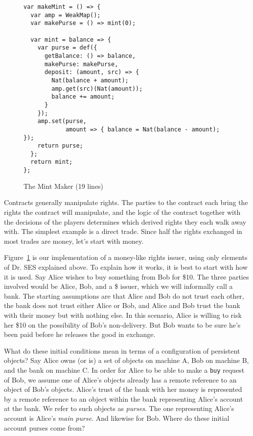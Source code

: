 \documentclass{llncs}
\begin{document}
\begin{figure}[htbp]
\begin{center}
\begin{verbatim}
var makeMint = () => {
  var amp = WeakMap();
  var makePurse = () => mint(0);
  
  var mint = balance => {
    var purse = def({
      getBalance: () => balance,
      makePurse: makePurse,
      deposit: (amount, src) => {
        Nat(balance + amount);
        amp.get(src)(Nat(amount)); 
        balance += amount; 
      } 
    });
    amp.set(purse, 
            amount => { balance = Nat(balance - amount); });
    return purse;
  };
  return mint;
};
\end{verbatim}
\caption{The Mint Maker (19 lines)}
\label{makeMint}
\end{center}
\end{figure}


Contracts generally manipulate rights. The parties to the contract each bring the rights the contract will manipulate, and the logic of the contract together with the decisions of the players determines which derived rights they each walk away with. The simplest example is a direct trade. Since half the rights exchanged in most trades are money, let's start with money. 

Figure~\ref{makeMint}  is our implementation of a money-like rights issuer, using only elements of Dr. SES explained above. To explain how it works, it is best to start with how it is used. Say Alice wishes to buy something from Bob for \$10. The three parties involved would be Alice, Bob, and a \$ issuer, which we will informally call a bank. The starting assumptions are that Alice and Bob do not trust each other, the bank does not trust either Alice or Bob, and Alice and Bob trust the bank with their money but with nothing else. In this scenario, Alice is willing to risk her \$10 on the possibility of Bob's non-delivery. But Bob wants to be sure he's been paid before he releases the good in exchange.

What do these initial conditions mean in terms of a configuration of persistent objects? Say Alice owns (or is) a set of objects on machine A, Bob on machine B, and the bank on machine C. In order for Alice to be able to make a {\tt buy} request of Bob, we assume one of Alice's objects already has a remote reference to an object of Bob's objects. Alice's trust of the bank with her money is represented by a remote reference to an object within the bank representing Alice's account at the bank. We refer to such objects as \emph{purses}. The one representing Alice's account is Alice's \emph{main purse}. And likewise for Bob. Where do these initial account purses come from?
\end{document}
